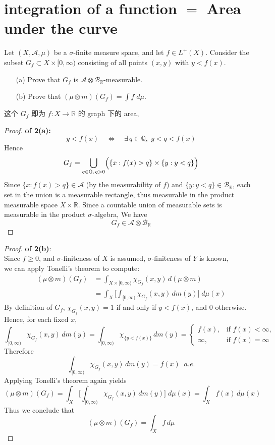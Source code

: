 \documentclass[lang=cn,11pt]{elegantbook}
\begin{document}
\section{integration of a function $=$ Area under the curve}
  Let $(X,\mathcal{A},\mu)$ be a $\sigma$-finite measure space, and let $f\in L^+(X)$. Consider the subset  $G_f\subset X\times[0,\infty)$ consisting of all points $(x,y)$ with $y<f(x)$.
  \begin{itemize}
  \item[(a)]Prove that $G_f$ is $\mathcal{A}\otimes\mathcal{B}_\mathbb{R}$-measurable.
  \item[(b)]Prove that $(\mu\otimes m)(G_f)=\int f\; d\mu$.
  \end{itemize}  
\begin{remark}
    这个 $G_f$ 即为 $f:X \to \mathbb{R}$ 的 graph 下的 area, 
\end{remark}
\begin{proof}
    \textbf{of 2(a):}\\
\[y < f(x)\quad\Longleftrightarrow\quad
\exists\,q\in\mathbb{Q},\; y < q < f(x)\]
Hence
\[G_f =
\bigcup_{q\in\mathbb{Q},\,q>0}\Bigl(\{x : f(x) > q\}\times \{y : y < q\}\Bigr)
\]
Since \(\{x : f(x) > q\}\in \mathcal{A}\) (by the measurability of \(f\)) and \(\{y : y < q\}\in \mathcal{B}_\mathbb{R}\), each set in the union is a measurable rectangle, thus measurable in the product measurable space \(X \times \mathbb{R}\). Since a countable union of measurable sets is measurable in the product \(\sigma\)-algebra, 
We have \[G_f \in \mathcal{A}\otimes \mathcal{B}_\mathbb{R}\]
\end{proof}
\begin{proof}
    \textbf{of 2(b)}:\\
Since \(f \ge 0\), and \(\sigma\)-finiteness of $X$ is assumed, \(\sigma\)-finiteness of $Y$ is known, \\ 
we can apply Tonelli’s theorem to compute:
\begin{align}
    (\mu \otimes m)(G_f) &= 
\int_{X\times [0,\infty)} \chi_{G_f}(x,y)\, d(\mu\otimes m)\\
&= \int_X  \Big[ \int_ {[0,\infty)} \chi_{G_f}(x,y)\, d m(y)\Big] \;d \mu(x)
\end{align}
By definition of \(G_f\), \(\chi_{G_f}(x,y) = 1\) if and only if \(y < f(x)\), and \(0\) otherwise. Hence, for each fixed \(x\),
\[
\int_{[0,\infty)} \chi_{G_f}(x,y)\,dm(y) =
\int_{[0,\infty)} \chi_{\{ y < f(x)\}}\,dm(y) = 
\begin{cases}
f(x), & \text{if } f(x) < \infty,\\
\infty, & \text{if } f(x) = \infty
\end{cases}
\]
Therefore
\[
\int_{[0,\infty)} \chi_{G_f}(x,y)\,dm(y) = f(x) \;\; a.e.
\]
Applying Tonelli’s theorem again yields
\[
(\mu \otimes m)(G_f) = \int_X  \Big[ \int_ {[0,\infty)} \chi_{G_f}(x,y)\, d m(y)\Big] \;d \mu(x) = 
\int_X f(x)\, d\mu(x)
\]
Thus we conclude that
\[
(\mu \otimes m)(G_f) = 
\int_X f \, d\mu \]
\end{proof}
\end{document}
